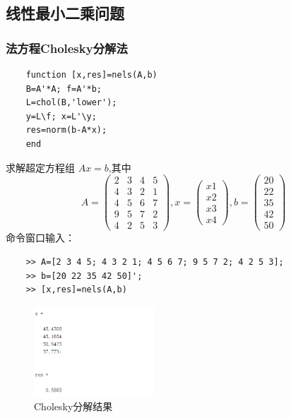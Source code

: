\documentclass[12pt]{article} %
\begin{document}
	\subsection{线性最小二乘问题}
	\subsubsection{法方程Cholesky分解法}
	\begin{lstlisting}
	function [x,res]=nels(A,b)
	B=A'*A; f=A'*b;
	L=chol(B,'lower');
	y=L\f; x=L'\y;
	res=norm(b-A*x);
	end
	\end{lstlisting}
	\indent 求解超定方程组 $Ax=b$,其中\\
	\indent $$A=\begin{pmatrix}
		2 & 3 & 4 & 5\\
		4 & 3 & 2 & 1\\
		4 & 5 & 6 & 7\\
		9 & 5 & 7 & 2\\
		4 & 2 &5 & 3
	\end{pmatrix},
	x=\begin{pmatrix}
		x1\\
		x2\\
		x3\\
		x4
	\end{pmatrix},
	b=\begin{pmatrix}
		20\\
		22\\
		35\\
		42\\
		50
	\end{pmatrix}$$
	\indent 命令窗口输入：
	\begin{lstlisting}
	>> A=[2 3 4 5; 4 3 2 1; 4 5 6 7; 9 5 7 2; 4 2 5 3];
	>> b=[20 22 35 42 50]';
	>> [x,res]=nels(A,b)
	\end{lstlisting}
	\begin{figure}[ht]
		\centering
		\includegraphics[width=0.4\textwidth]{nels.png}
		\caption{Cholesky分解结果}
		\label{fig:fig1}
	\end{figure}
\end{document}
